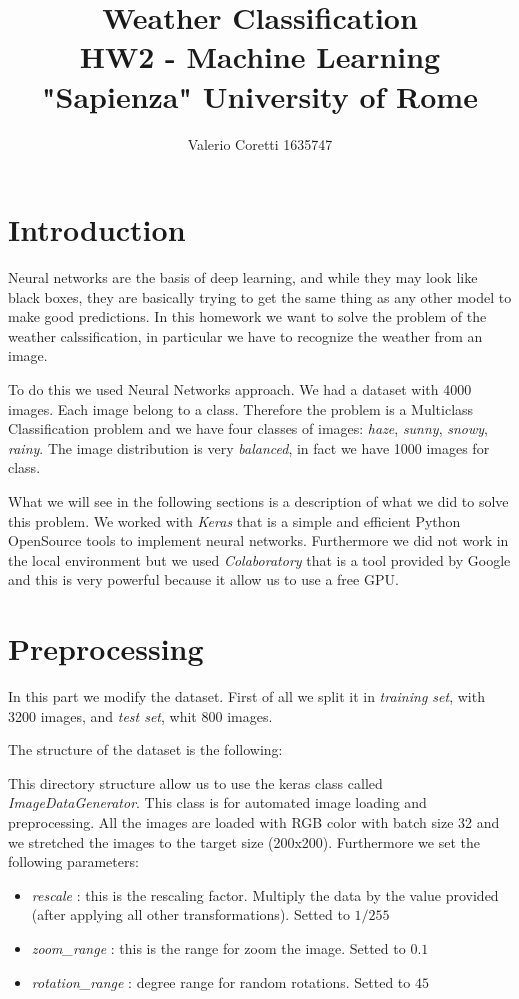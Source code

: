 \documentclass[12pt]{article}
\title{{\bf Weather Classification} \\ \bigskip \large HW2 - Machine Learning \\ \large "Sapienza" University of Rome}
\author{Valerio Coretti 1635747}
\begin{document}
\maketitle

\section{Introduction}
Neural networks are the basis of deep learning, and while they may look like black boxes, they are basically trying to get the same thing as any other model to make good predictions. In this homework we want to solve the problem of the {weather calssification}, in particular we have to recognize the weather from an image.

To do this we used Neural Networks approach. We had a dataset with 4000 images. Each image belong to a class. Therefore the problem is a Multiclass Classification problem and we have four classes of images: {\em haze}, {\em sunny}, {\em snowy}, {\em rainy}. The image distribution is very {\em balanced}, in fact we have 1000 images for class.

What we will see in the following sections is a description of what we did to solve this problem. We worked with {\em Keras} that is a simple and efficient Python OpenSource tools to implement neural networks. Furthermore we did not work in the local environment but we used {\em Colaboratory} that is a tool provided by Google and this is very powerful because it allow us to use a free GPU.

\section{Preprocessing}
In this part we modify the dataset. First of all we split it in {\em training set}, with 3200 images, and {\em test set}, whit 800 images.

The structure of the dataset is the following:

\bigskip
{}

This directory structure allow us to use the keras class called {\em ImageDataGenerator}. This class is for automated image loading and preprocessing. All the images are loaded with RGB color with batch size 32 and we stretched the images to the target size (200x200). Furthermore we set the following parameters:
\begin{itemize}
  \item {\em rescale} : this is the rescaling factor. Multiply the data by the value provided (after applying all other transformations). Setted to $1/255$
  \item {\em zoom\_range} : this is the range for zoom the image. Setted to $0.1$
  \item {\em rotation\_range} : degree range for random rotations. Setted to $45$
\end{itemize}
\end{document}
